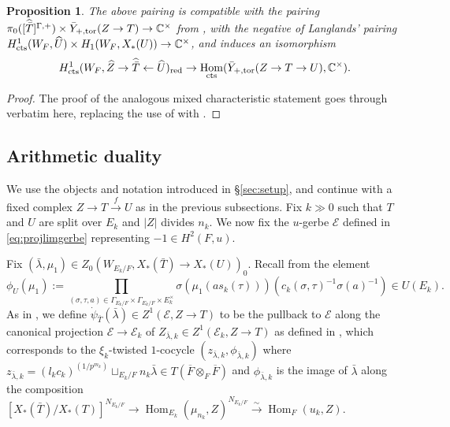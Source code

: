 \documentclass{amsart}
\newtheorem{proposition}[result]{Proposition}
\theoremstyle{definition}
\theoremstyle{remark}
\DeclareMathOperator\Hom{Hom}
\newcommand\cts{\textnormal{cts}}
\newcommand{\ov}{\overline}
\begin{document}
\begin{proposition}\label{prop:pp1}
    The above pairing is compatible with the pairing $ \pi_{0}([\widehat{\bar{T}}]^{\Gamma,+}) \times \bar{Y}_{+,\textnormal{tor}}(Z \to T) \to \mathbb{C}^{\times}$ from \cite[Proposition 7.10]{Dillery1}, with the negative of Langlands' pairing $H_{\cts}^{1}(W_{F},\widehat{U}) \times H_{1}(W_{F},X_{*}(U))\to \mathbb{C}^{\times}$, and induces an isomorphism
    \begin{equation*}
       H^{1}_{\textnormal{cts}}(W_{F}, \widehat{Z} \to \widehat{\bar{T}} \leftarrow \widehat{U})_{\textnormal{red}} \to \Hom_{\cts}(\bar{Y}_{+,\textnormal{tor}}(Z \to T \to U),\mathbb{C}^{\times}).
    \end{equation*}
\end{proposition}

\begin{proof}
    The proof of the analogous mixed characteristic statement \cite[Fact 5.6]{Kal26b} goes through verbatim here, replacing the use of \cite[Proposition 5.3]{kaletha16} with \cite[Proposition 7.10]{Dillery1}.
\end{proof}

\subsection{Arithmetic duality}
We use the objects and notation introduced in \S \ref{sec:setup}, and continue with a fixed complex $Z \to T \xrightarrow{f} U$ as in the previous subsections. Fix $k \gg 0$ such that $T$ and $U$ are split over $E_{k}$ and $|Z|$ divides $n_{k}$. We now fix the $u$-gerbe $\mathcal{E}$ defined in \eqref{eq:projlimgerbe} representing $-1 \in H^{2}(F,u)$.

Fix $(\bar{\lambda},\mu_{1}) \in Z_{0}(W_{E_{k}/F}, X_{*}(\bar{T}) \to X_{*}(U))_{0}$. Recall from \cite[\S A.3]{KS99} the element
\begin{equation*}
    \phi_{U}(\mu_{1}):=\prod_{(\sigma,\tau,a) \in \Gamma_{E_{k}/F} \times \Gamma_{E_{k}/F} \times E_{k}^{\times}} \sigma(\mu_{1}(as_{k}(\tau)))(c_{k}(\sigma,\tau)^{-1}\sigma(a)^{-1}) \in U(E_{k}).
\end{equation*}
As in \cite[\S 5.2]{Kal26b}, we define $\dot{\psi}_{\bar{T}}(\bar{\lambda}) \in Z^{1}(\mathcal{E},Z \to T)$ to be the pullback to $\mathcal{E}$ along the canonical projection $\mathcal{E} \to \mathcal{E}_{k}$ of $Z_{\bar{\lambda},k} \in Z^{1}(\mathcal{E}_{k}, Z \to T)$ as defined in \cite[\S 4.3, before Lemma 4.9]{Dillery1}, which corresponds to the $\xi_{k}$-twisted $1$-cocycle $(z_{\bar{\lambda},k}, \phi_{\bar{\lambda},k})$ where $z_{\bar{\lambda},k}= (l_{k}c_{k})^{(1/p^{m_{k}})} \sqcup_{E_{k}/F} n_{k}\bar{\lambda} \in T(\ov{F} \otimes_{F} \ov{F})$ and $\phi_{\bar{\lambda},k}$ is the image of $\bar{\lambda}$ along the composition $[X_{*}(\bar{T})/X_{*}(T)]^{N_{E_{k}/F}} \to \Hom_{E_{k}}(\mu_{n_{k}},Z)^{N_{E_{k}/F}} \xrightarrow{\sim} \Hom_{F}(u_{k},Z)$.
\end{document}
